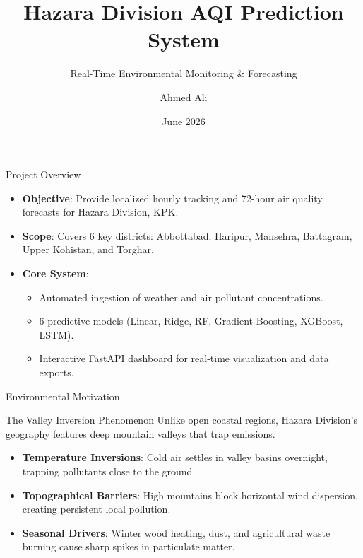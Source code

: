 \documentclass[aspectratio=169]{beamer}
\title[AQI Prediction \& Monitoring]{Hazara Division AQI Prediction System}
\subtitle{Real-Time Environmental Monitoring \& Forecasting}
\author[Ahmed Ali]{Ahmed Ali}
\institute[10Pearls]{10Pearls Internship Project}
\date{June 2026}
\begin{document}
\begin{frame}
  \titlepage
\end{frame}

\begin{frame}{Project Overview}
  \begin{itemize}
    \item \textbf{Objective}: Provide localized hourly tracking and 72-hour air quality forecasts for Hazara Division, KPK.
    \item \textbf{Scope}: Covers 6 key districts: Abbottabad, Haripur, Mansehra, Battagram, Upper Kohistan, and Torghar.
    \item \textbf{Core System}:
      \begin{itemize}
        \item Automated ingestion of weather and air pollutant concentrations.
        \item 6 predictive models (Linear, Ridge, RF, Gradient Boosting, XGBoost, LSTM).
        \item Interactive FastAPI dashboard for real-time visualization and data exports.
      \end{itemize}
  \end{itemize}
\end{frame}

\begin{frame}{Environmental Motivation}
  \begin{block}{The Valley Inversion Phenomenon}
    Unlike open coastal regions, Hazara Division's geography features deep mountain valleys that trap emissions.
  \end{block}
  \begin{itemize}
    \item \textbf{Temperature Inversions}: Cold air settles in valley basins overnight, trapping pollutants close to the ground.
    \item \textbf{Topographical Barriers}: High mountains block horizontal wind dispersion, creating persistent local pollution.
    \item \textbf{Seasonal Drivers}: Winter wood heating, dust, and agricultural waste burning cause sharp spikes in particulate matter.
  \end{itemize}
\end{frame}
\end{document}
